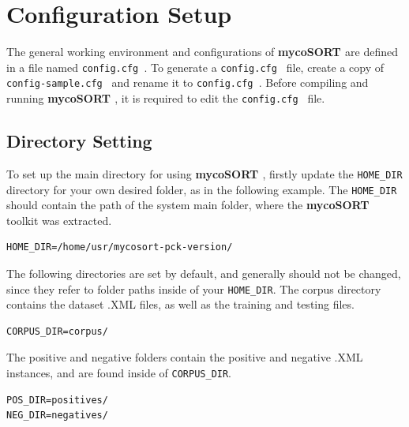 \documentclass[11pt]{article}
\newcommand{\mycos}{{\bf{mycoSORT{ }}}}
\newcommand{\configfile}{\texttt{config.cfg{ }}}
\newcommand{\configsample}{\texttt{config-sample.cfg{ }}}
\begin{document}
% 

\section{Configuration Setup}
\label{sec:configuration}
The general working environment and configurations of \mycos{} are defined in a file named \configfile{}.
To generate a \configfile{} file, create a copy of \configsample{} and rename it to \configfile{}.
Before compiling and running \mycos{}, it is required to edit the \configfile{} file.

\subsection{Directory Setting}
\label{directory}
To set up the main directory for using \mycos{}, firstly update the \texttt{HOME\_DIR} directory for your own desired folder, as in the following example.
The \texttt{HOME\_DIR} should contain the path of the system main folder, where the \mycos{} toolkit was extracted.
\begin{lstlisting}
HOME_DIR=/home/usr/mycosort-pck-version/
\end{lstlisting}

The following directories are set by default, and generally should not be changed, 
since they refer to folder paths inside of your \texttt{HOME\_DIR}.
The corpus directory contains the dataset .XML files, as well as the training and testing files.
\begin{lstlisting}
CORPUS_DIR=corpus/
\end{lstlisting}

The positive and negative folders contain the positive and negative .XML instances, and are found inside of \texttt{CORPUS\_DIR}.
\begin{lstlisting}
POS_DIR=positives/
NEG_DIR=negatives/
\end{lstlisting}
\end{document}
